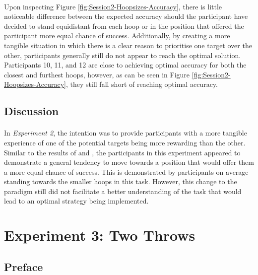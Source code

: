 \documentclass[12pt]{article}
\begin{document}
\paragraph{} Upon inspecting Figure \ref{fig:Session2-Hoopsizes-Accuracy}, there is little noticeable difference between the expected accuracy should the participant have decided to stand equidistant from each hoop or in the position that offered the participant more equal chance of success. Additionally, by creating a more tangible situation in which there is a clear reason to prioritise one target over the other, participants generally still do not appear to reach the optimal solution. Participants 10, 11, and 12 are close to achieving optimal accuracy for both the closest and furthest hoops, however, as can be seen in Figure \ref{fig:Session2-Hoopsizes-Accuracy}, they still fall short of reaching optimal accuracy. 

\subsection*{Discussion}

\paragraph{} In \textit{Experiment 2}, the intention was to provide participants with a more tangible experience of one of the potential targets being more rewarding than the other. Similar to the results of \cite{CHAPMAN2010168} and \cite{Hudson2007probmove}, the participants in this experiment appeared to demonstrate a general tendency to move towards a position that would offer them a more equal chance of success. This is demonstrated by participants on average standing towards the smaller hoops in this task. However, this change to the paradigm still did not facilitate a better understanding of the task that would lead to an optimal strategy being implemented. 


\section*{Experiment 3: Two Throws}

\subsection*{Preface}
\end{document}
